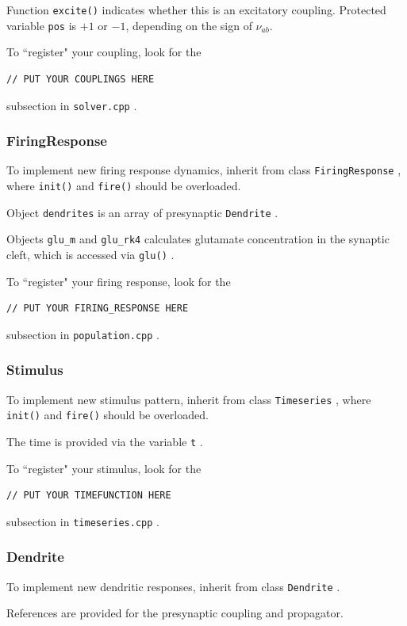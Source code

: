 \documentclass[12pt,a4paper]{article}
\newcommand{\type}[1]{{\small\small\tt #1} }
\begin{document}
Function \type{excite()} indicates whether this is an excitatory coupling. Protected variable \type{pos} is $+1$ or $-1$, depending on the sign of \(\nu_{ab}\).

To ``register" your coupling, look for the
\begin{lstlisting}
// PUT YOUR COUPLINGS HERE
\end{lstlisting}
subsection in \type{solver.cpp}.

\subsubsection{FiringResponse}

To implement new firing response dynamics, inherit from class \type{FiringResponse}, where \type{init()} and \type{fire()} should be overloaded.

Object \type{dendrites} is an array of presynaptic \type{Dendrite}.

Objects \type{glu\_m} and \type{glu\_rk4} calculates glutamate concentration in the synaptic cleft, which is accessed via \type{glu()}.

To ``register" your firing response, look for the
\begin{lstlisting}
// PUT YOUR FIRING_RESPONSE HERE
\end{lstlisting}
subsection in \type{population.cpp}.

\subsubsection{Stimulus}

To implement new stimulus pattern, inherit from class \type{Timeseries}, where \type{init()} and \type{fire()} should be overloaded.

The time is provided via the variable \type{t}.

To ``register" your stimulus, look for the
\begin{lstlisting}
// PUT YOUR TIMEFUNCTION HERE
\end{lstlisting}
subsection in \type{timeseries.cpp}.

\subsubsection{Dendrite}
\label{sec:dendrite}

To implement new dendritic responses, inherit from class \type{Dendrite}.

References are provided for the presynaptic coupling and propagator.
\end{document}
